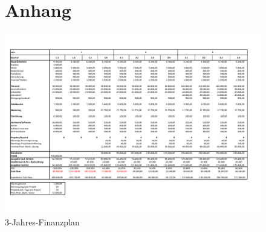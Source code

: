 
\begin{figure}
\section{Anhang}
\label{sec:finanzplan}

\centering
\includegraphics[width=1\linewidth]{../Bilder/Finanzplan}
\caption{3-Jahres-Finanzplan}
\label{fig:Finanzplan}

\end{figure}
